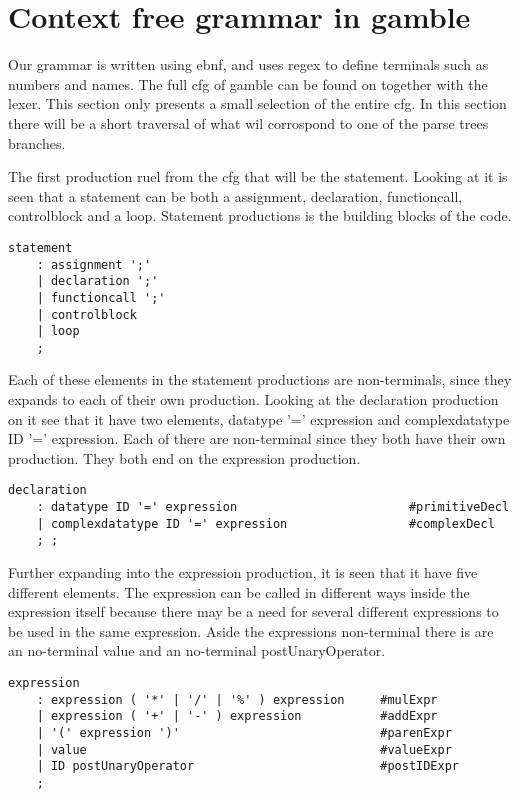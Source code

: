 \section{Context free grammar in gamble}
Our grammar is written using \acrfull{ebnf}, and uses \acrfull{regex} to define terminals such as numbers and names.
The full \acrshort{cfg} of \gls{gamble} can be found on  together with the lexer. This section only presents a small selection of the entire \acrshort{cfg}.
In this section there will be a short traversal of what wil corrospond to one of the parse trees branches.

The first production ruel from the \acrshort{cfg} that will be the statement. 
Looking at  it is seen that a statement can be both a assignment, declaration, functioncall, controlblock and a loop. 
Statement productions is the building blocks of the code.

\begin{lstlisting}[caption={\acrshort{cfg} Statement},frame=tlrb,label={lst:statements},numbers=none]
statement
    : assignment ';'
    | declaration ';'
    | functioncall ';'
    | controlblock
    | loop
    ;
\end{lstlisting}

Each of these elements in the statement productions are non-terminals, since they expands to each of their own production.
Looking at the declaration production on  it see that it have two elements, datatype '=' expression and complexdatatype ID '=' expression.
Each of there are non-terminal since they both have their own production. They both end on the expression production.

\begin{lstlisting}[caption={\acrshort{cfg} Declaration},frame=tlrb,label={lst:declaration},numbers=none]
declaration
    : datatype ID '=' expression                        #primitiveDecl
    | complexdatatype ID '=' expression                 #complexDecl
    ; ;
\end{lstlisting}

Further expanding into the expression production, it is seen that it have five different elements.
The expression can be called in different ways inside the expression itself because there may be a need for several different expressions to be used in the same expression.
Aside the expressions non-terminal there is are an no-terminal value and an no-terminal postUnaryOperator.
\begin{lstlisting}[caption={\acrshort{cfg} Expression},frame=tlrb,label={lst:expression},numbers=none]
expression
    : expression ( '*' | '/' | '%' ) expression     #mulExpr
    | expression ( '+' | '-' ) expression           #addExpr
    | '(' expression ')'                            #parenExpr
    | value                                         #valueExpr
    | ID postUnaryOperator                          #postIDExpr
    ;
\end{lstlisting}
  
